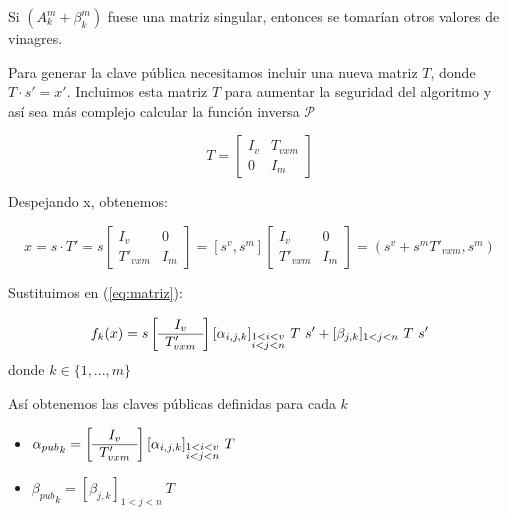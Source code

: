 Si $(A_k^m + \beta_k^m)$ fuese una matriz singular, entonces se tomarían otros valores de vinagres.


Para generar la clave pública necesitamos incluir una nueva matriz $T$, donde $T \cdot s' = x'$. Incluimos esta matriz $T$ para aumentar la seguridad del algoritmo y así sea más complejo calcular la función inversa $\mathcal{P}$

\begin{equation}
	T =
	\left[
	\begin{array}{c|c}
	I_v & T_{vxm} \\
	\hline
	0 & I_m
	\end{array}
	\right]
	\label{mat:T}
\end{equation}

Despejando x, obtenemos:

\begin{equation}\label{eq:def-x}
	x =  s \cdot T' = s  \left[
	\begin{array}{c|c}
	I_v & 0 \\
	\hline
	T'_{v x m} & I_m
	\end{array}
	\right]
	= [s^v, s^m] \left[
	\begin{array}{c|c}
	I_v & 0 \\
	\hline
	T'_{v x m} & I_m
	\end{array}
	\right]
	= (s^v + s^m T'_{vxm}, s^m )
\end{equation}

Sustituimos en (\ref{eq:matriz}):

\begin{equation}
	f_k(x) = s  \left[
	\begin{array}{c}
	I_v \\
	\hline
	T'_{v x m}
	\end{array}
	\right] [\alpha_{i,j,k}]_{\begin{subarray}{l}{1<i<v }\\ {i<j<n}\end{subarray}}\ T \ s' + [\beta_{j,k}]_{1<j<n}\ T\ s'
\end{equation}
donde $k \in \{1,...,m\}$

Así obtenemos las claves públicas definidas para cada $k$

\begin{itemize}
	\item ${\alpha_{pub}}_k = \left[
	\begin{array}{c}
	I_v \\
	\hline
	T'_{v x m}
	\end{array}
	\right] [\alpha_{i,j,k}]_{\begin{subarray}{l}{1<i<v }\\ {i<j<n}\end{subarray}} \ T$
	
	\item ${\beta_{pub}}_k = [\beta_{j,k}]_{1<j<n}\ T$

\end{itemize}


